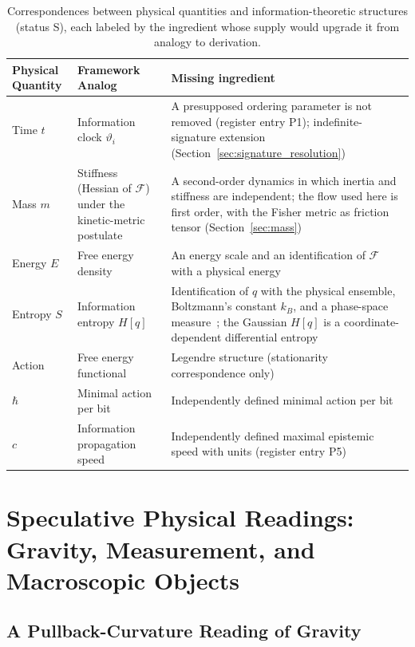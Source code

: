 \begin{table}[h]
\centering
\begin{tabularx}{\linewidth}{|l|X|X|}
\hline
\textbf{Physical Quantity} & \textbf{Framework Analog} & \textbf{Missing ingredient} \\
\hline
Time $t$ & Information clock $\vartheta_i$ & A presupposed ordering parameter is not removed (register entry P1); indefinite-signature extension (Section~\ref{sec:signature_resolution}) \\
Mass $m$ & Stiffness (Hessian of $\mathcal{F}$) under the kinetic-metric postulate & A second-order dynamics in which inertia and stiffness are independent; the flow used here is first order, with the Fisher metric as friction tensor (Section~\ref{sec:mass}) \\
Energy $E$ & Free energy density & An energy scale and an identification of $\mathcal{F}$ with a physical energy \\
Entropy $S$ & Information entropy $H[q]$ & Identification of $q$ with the physical ensemble, Boltzmann's constant $k_B$, and a phase-space measure~\cite{Jaynes1957}; the Gaussian $H[q]$ is a coordinate-dependent differential entropy \\
Action & Free energy functional & Legendre structure (stationarity correspondence only) \\
$\hbar$ & Minimal action per bit & Independently defined minimal action per bit \\
$c$ & Information propagation speed & Independently defined maximal epistemic speed with units (register entry P5) \\
\hline
\end{tabularx}
\caption{Correspondences between physical quantities and information-theoretic structures (status S), each labeled by the ingredient whose supply would upgrade it from analogy to derivation.}
\label{tab:physical_correspondences}
\end{table}

\section{Speculative Physical Readings: Gravity, Measurement, and Macroscopic Objects}\label{sec:speculative_physics}

\subsection{A Pullback-Curvature Reading of Gravity}
\label{sec:gravity_pullback}

